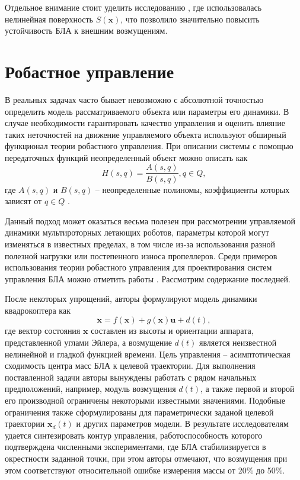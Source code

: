 Отдельное внимание стоит уделить исследованию \cite{Sumantri01}, где использовалась нелинейная поверхность $S(\bm x)$, что позволило значительно повысить устойчивость БЛА к внешним возмущениям.

\section{Робастное управление}

В реальных задачах часто бывает невозможно с абсолютной точностью определить модель рассматриваемого объекта или параметры его динамики.
В случае необходимости гарантировать качество управления и оценить влияние таких неточностей на движение управляемого объекта используют обширный функционал теории робастного управления.
При описании системы с помощью передаточных функций неопределенный объект можно описать как
\begin{equation} \label{eq:robust_ctrl_obj}
H(s, q) = \frac{A(s, q)}{B(s, q)}, q \in Q,
\end{equation}
где $A(s, q)$ и $B(s, q)$ -- неопределенные полиномы, коэффициенты которых зависят от $q \in Q$ \cite{Polyak01}. 

Данный подход может оказаться весьма полезен при рассмотрении управляемой динамики
мультироторных летающих роботов, параметры которой могут изменяться в известных пределах, в том числе из-за использования разной полезной нагрузки или постепенного износа пропеллеров. Среди примеров использования теории робастного управления для проектирования систем управления БЛА можно отметить работы \cite{Lee02, Borisov01, Petranevsky01, Bai01, Tony01}. Рассмотрим содержание последней.

После некоторых упрощений, авторы формулируют модель динамики квадрокоптера как 
\begin{equation} \label{eq:Tony_dyn}
\ddot{\bm x} = f(\bm x) + g( \bm x) \bm u + d(t),
\end{equation}
где вектор состояния $\bm x$ составлен из высоты и ориентации аппарата, представленной углами Эйлера, а возмущение $d(t)$ является неизвестной нелинейной и гладкой функцией времени. Цель управления -- асимптотическая сходимость центра масс БЛА к целевой траектории. Для выполнения поставленной задачи авторы вынуждены работать с рядом начальных предположений, например, модуль возмущения $d(t)$, а также первой и второй его производной ограничены некоторыми известными значениями. Подобные ограничения также сформулированы для параметрически заданой целевой траектории $\bm x_d(t)$ и других параметров модели. В результате исследователям удается синтезировать контур управления, работоспособность которого подтверждена численными экспериментами, где БЛА стабилизируется в окрестности заданной точки, при этом авторы отмечают, что возмущения при этом соответствуют относительной ошибке измерения массы от 20\% до 50\%.

